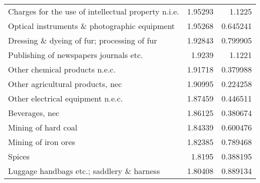 \begin{tabular}{lrr}
 Charges for the use of intellectual property n.i.e.       &   1.95293     & 1.1225      \\
 Optical instruments \& photographic equipment              &   1.95268     & 0.645241    \\
 Dressing \& dyeing of fur; processing of fur               &   1.92843     & 0.799905    \\
 Publishing of newspapers journals etc.                    &   1.9239      & 1.1221      \\
 Other chemical products n.e.c.                            &   1.91718     & 0.379988    \\
 Other agricultural products, nec                          &   1.90995     & 0.224258    \\
 Other electrical equipment n.e.c.                         &   1.87459     & 0.446511    \\
 Beverages, nec                                            &   1.86125     & 0.380674    \\
 Mining of hard coal                                       &   1.84339     & 0.600476    \\
 Mining of iron ores                                       &   1.82385     & 0.789468    \\
 Spices                                                    &   1.8195      & 0.388195    \\
 Luggage handbags etc.; saddlery \& harness                 &   1.80408     & 0.889134    \\

\hline
\end{tabular}